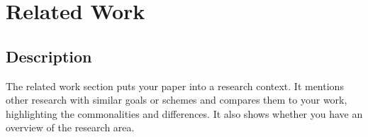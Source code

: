 \section{Related Work}
\subsection{Description}
The related work section puts your paper into a research
context. It mentions other research with similar goals or
schemes and compares them to your work, highlighting the
commonalities and differences. It also shows whether you have
an overview of the research area.
